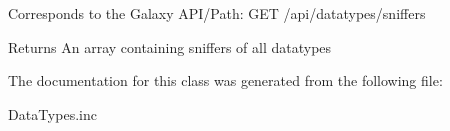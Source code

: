 Corresponds to the Galaxy A\-P\-I/\-Path\-: G\-E\-T /api/datatypes/sniffers

\begin{DoxyReturn}{Returns}
An array containing sniffers of all datatypes 
\end{DoxyReturn}


The documentation for this class was generated from the following file\-:\begin{DoxyCompactItemize}
\item 
Data\-Types.\-inc\end{DoxyCompactItemize}
